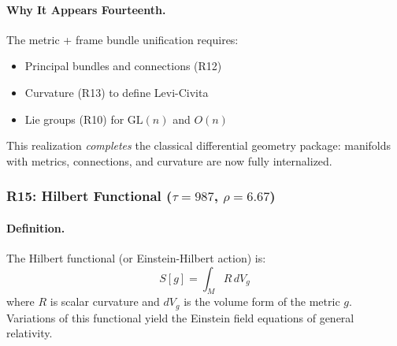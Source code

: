 \documentclass[11pt]{article}
\theoremstyle{definition}
\begin{document}
\paragraph{Why It Appears Fourteenth.}
The metric + frame bundle unification requires:
\begin{itemize}
\item Principal bundles and connections (R12)
\item Curvature (R13) to define Levi-Civita
\item Lie groups (R10) for $\text{GL}(n)$ and $O(n)$
\end{itemize}

This realization \emph{completes} the classical differential geometry package: manifolds with metrics, connections, and curvature are now fully internalized.

\subsubsection{R15: Hilbert Functional ($\tau=987$, $\rho=6.67$)}

\paragraph{Definition.}
The Hilbert functional (or Einstein-Hilbert action) is:
\[
S[g] = \int_M R \, dV_g
\]
where $R$ is scalar curvature and $dV_g$ is the volume form of the metric $g$. Variations of this functional yield the Einstein field equations of general relativity.
\end{document}
